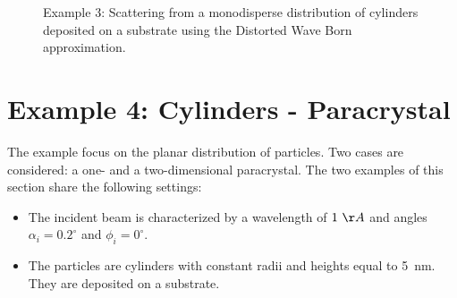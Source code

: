 \begin{figure}[H]
\hfill
{}
\hfill
{}
\hfill
\caption{Example 3: Scattering from a monodisperse distribution of cylinders deposited on a substrate using the Distorted Wave Born approximation.}
\label{fig:PythonEx3DWBA}
\end{figure}


\newpage
\section{Example 4: Cylinders - Paracrystal}
The example focus on the planar distribution of particles. Two cases are considered: a one- and a two-dimensional paracrystal. 
The two examples of this section share the following settings:
\begin{itemize}
\item The incident beam is characterized by a wavelength of $1~\AA$ and angles $\alpha_i=0.2^{\circ}$ and $\phi_i=0^{\circ}$.
\item The particles are cylinders with constant radii and heights equal to 5~nm. They are deposited on a substrate.
\end{itemize}
